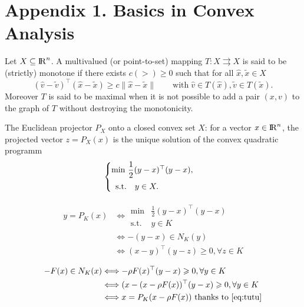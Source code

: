 
\section*{Appendix 1. Basics in Convex Analysis}
\label{Sec:Ann:ConvexAnalysis}
\begin{definition}\label{def:MM}
 Let $X\subseteq \mathrm{I\!R}^n$. A multivalued (or point-to-set) mapping $T\colon X\rightrightarrows X$ is said to be (strictly) monotone if
 there exists $c (>) \geq 0$ such that for all $\hat{x}, \widetilde{x} \in X$
 \begin{equation}
  {(\hat{v} - \widetilde{v})}^\top(\hat{x} - \widetilde{x})\geq c \|\hat{x} - \widetilde{x}\|\qquad\text{with}\; \hat{v}\in T(\hat{x}), \widetilde{v}\in T(\widetilde{x}).
 \end{equation}
 Moreover $T$ is said to be maximal when it is not possible to add a pair $(x, v)$ to the graph of $T$ without destroying the monotonicity.
\end{definition}

The Euclidean projector $P_X$ onto a closed convex set $X$: for a vector $x\in \mathrm{I\!R}^n$, the projected vector $z  = P_X(x)$ is the unique solution of the convex quadratic programm
\begin{equation}
  \label{eq:opt-proj}
  \begin{cases}
    \min\, \Frac 1 2 (y-x)^\top(y-x), \\[2mm]
    \begin{array}{ll}
     \text{s.t.} & y \in X .
  \end{array}
  \end{cases}
\end{equation}


\begin{align}
y = P_K(x) & \Longleftrightarrow 
\begin{array}{ll}
  \min &\frac 1 2 (y-x)^\top (y-x ) \\
  \text {s.t. } & y \in K
\end{array}
\\
& \Longleftrightarrow  - (y-x) \in N_K(y) \\
& \Longleftrightarrow  (x-y)^\top(y-z) \geq 0, \forall z \in K 
\label{eq:tutu}
\end{align}

\begin{align}
-F(x) \in N_K(x) & \Longleftrightarrow -\rho F(x)^\top(y-x) \geq 0, \forall y \in K\\
& \Longleftrightarrow  (x-(x - \rho F(x))^\top(y-x) \geq 0, \forall y \in K \\
& \Longleftrightarrow  x = P_K(x- \rho F(x)) \text{ thanks to~\eqref{eq:tutu}} 
\end{align}

